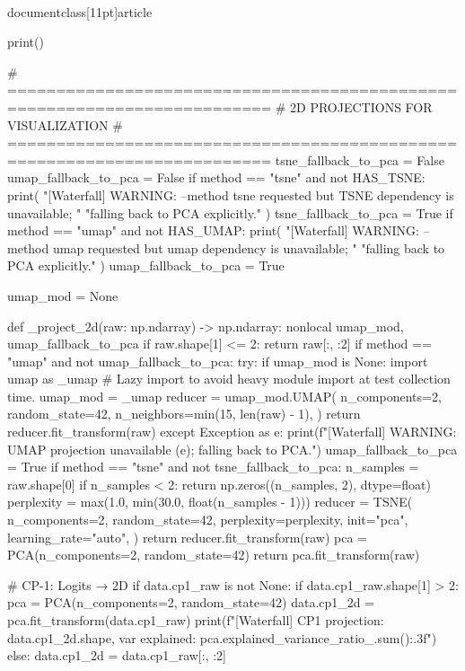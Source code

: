 \\documentclass[11pt]{article}
\begin{document}
\begin{CodeBlock}
    print()

    # =========================================================================
    # 2D PROJECTIONS FOR VISUALIZATION
    # =========================================================================
    tsne_fallback_to_pca = False
    umap_fallback_to_pca = False
    if method == "tsne" and not HAS_TSNE:
        print(
            "[Waterfall] WARNING: --method tsne requested but TSNE dependency is unavailable; "
            "falling back to PCA explicitly."
        )
        tsne_fallback_to_pca = True
    if method == "umap" and not HAS_UMAP:
        print(
            "[Waterfall] WARNING: --method umap requested but umap dependency is unavailable; "
            "falling back to PCA explicitly."
        )
        umap_fallback_to_pca = True

    umap_mod = None

    def _project_2d(raw: np.ndarray) -> np.ndarray:
        nonlocal umap_mod, umap_fallback_to_pca
        if raw.shape[1] <= 2:
            return raw[:, :2]
        if method == "umap" and not umap_fallback_to_pca:
            try:
                if umap_mod is None:
                    import umap as _umap  # Lazy import to avoid heavy module import at test collection time.
                    umap_mod = _umap
                reducer = umap_mod.UMAP(
                    n_components=2,
                    random_state=42,
                    n_neighbors=min(15, len(raw) - 1),
                )
                return reducer.fit_transform(raw)
            except Exception as e:
                print(f"[Waterfall] WARNING: UMAP projection unavailable ({e}); falling back to PCA.")
                umap_fallback_to_pca = True
        if method == "tsne" and not tsne_fallback_to_pca:
            n_samples = raw.shape[0]
            if n_samples < 2:
                return np.zeros((n_samples, 2), dtype=float)
            perplexity = max(1.0, min(30.0, float(n_samples - 1)))
            reducer = TSNE(
                n_components=2,
                random_state=42,
                perplexity=perplexity,
                init="pca",
                learning_rate="auto",
            )
            return reducer.fit_transform(raw)
        pca = PCA(n_components=2, random_state=42)
        return pca.fit_transform(raw)

    # CP-1: Logits → 2D
    if data.cp1_raw is not None:
        if data.cp1_raw.shape[1] > 2:
            pca = PCA(n_components=2, random_state=42)
            data.cp1_2d = pca.fit_transform(data.cp1_raw)
            print(f"[Waterfall] CP1 projection: {data.cp1_2d.shape}, var explained: {pca.explained_variance_ratio_.sum():.3f}")
        else:
            data.cp1_2d = data.cp1_raw[:, :2]


\end{CodeBlock}
\end{document}
